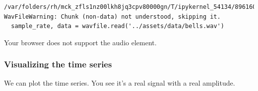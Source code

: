 \begin{Shaded}
\begin{Highlighting}[]
\OperatorTok{=}\NormalTok{)}
 \OperatorTok{\textgreater{}} \NormalTok{:}
\OperatorTok{=}\OperatorTok{=}\NormalTok{)}
\OperatorTok{=}
\end{Highlighting}
\end{Shaded}

\begin{verbatim}
/var/folders/rh/mck_zfls1nz00lkh8jq3cpv80000gn/T/ipykernel_54134/896160428.py:1: WavFileWarning: Chunk (non-data) not understood, skipping it.
  sample_rate, data = wavfile.read('../assets/data/bells.wav')
\end{verbatim}

Your browser does not support the audio element.

\subsubsection{Visualizing the time
series}\label{visualizing-the-time-series}

We can plot the time series. You see it's a real signal with a real
amplitude.

\begin{Shaded}
\begin{Highlighting}[]
\OperatorTok{=}\NormalTok{ data.shape[}\NormalTok{]}

\OperatorTok{=}\OperatorTok{/}\OperatorTok{=}

\OperatorTok{=}\NormalTok{(}\NormalTok{, }\NormalTok{))}
\NormalTok{)}
\NormalTok{)}
\NormalTok{)}
\end{Highlighting}
\end{Shaded}

